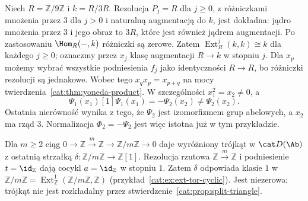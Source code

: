 \begin{przyklad}\label{cat:ex:derived-yoneda-sign}
Niech $R=\mathbb Z/9\mathbb Z$ i $k=R/3R$. Rezolucja $P_j=R$ dla $j\ge0$, z różniczkami mnożenia przez $3$ dla $j>0$ i naturalną augmentacją do $k$, jest dokładna: jądro mnożenia przez $3$ i jego obraz to $3R$, które jest również jądrem augmentacji. Po zastosowaniu $\Hom_R(-,k)$ różniczki są zerowe. Zatem $\operatorname{Ext}_R^j(k,k)\cong k$ dla każdego $j\ge0$; oznaczmy przez $x_j$ klasę augmentacji $R\to k$ w stopniu $j$. Dla $x_p$ możemy wybrać wszystkie podniesienia $f_j$ jako identyczności $R\to R$, bo różniczki rezolucji są jednakowe. Wobec tego $x_qx_p=x_{p+q}$ na mocy twierdzenia~\ref{cat:thm:yoneda-product}. W szczególności $x_1^2=x_2\ne0$, a
\[
 \Psi_1(x_1)[1]\Psi_1(x_1)=-\Psi_2(x_2)\ne\Psi_2(x_2).
\]
Ostatnia nierówność wynika z tego, że $\Psi_2$ jest izomorfizmem grup abelowych, a $x_2$ ma rząd $3$. Normalizacja $\Phi_2=-\Psi_2$ jest więc istotna już w tym przykładzie.
\end{przyklad}
\begin{przyklad}\label{cat:ex:derived-nonsplit-triangle}
Dla $m\ge2$ ciąg $0\to\mathbb Z\xrightarrow{m}\mathbb Z\to\mathbb Z/m\mathbb Z\to0$ daje wyróżniony trójkąt w $\cat D(\Ab)$ z ostatnią strzałką $\delta:\mathbb Z/m\mathbb Z\to\mathbb Z[1]$. Rezolucja rzutowa $\mathbb Z\xrightarrow m\mathbb Z$ i podniesienie $t=\id_{\mathbb Z}$ dają cocykl $a=\id_{\mathbb Z}$ w stopniu $1$. Zatem $\delta$ odpowiada klasie $1$ w $\mathbb Z/m\mathbb Z=\operatorname{Ext}^1_{\mathbb Z}(\mathbb Z/m\mathbb Z,\mathbb Z)$ (przykład~\ref{cat:ex:ext-tor-cyclic}). Jest niezerowa; trójkąt nie jest rozkładalny przez stwierdzenie~\ref{cat:prop:split-triangle}.
\end{przyklad}
